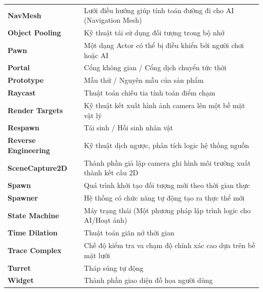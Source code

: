 \documentclass[../DoAn.tex]{subfiles}
\begin{document}
\begin{longtable}{l p{11.5cm}}
    \textbf{NavMesh} & Lưới điều hướng giúp tính toán đường đi cho AI (Navigation Mesh) \\
    \textbf{Object Pooling} & Kỹ thuật tái sử dụng đối tượng trong bộ nhớ \\
    \textbf{Pawn} & Một dạng Actor có thể bị điều khiển bởi người chơi hoặc AI \\
    \textbf{Portal} & Cổng không gian / Cổng dịch chuyển tức thời \\
    \textbf{Prototype} & Mẫu thử / Nguyên mẫu của sản phẩm \\
    \textbf{Raycast} & Thuật toán chiếu tia tính toán điểm chạm \\
    \textbf{Render Targets} & Kỹ thuật kết xuất hình ảnh camera lên một bề mặt vật lý \\
    \textbf{Respawn} & Tái sinh / Hồi sinh nhân vật \\
    \textbf{Reverse Engineering} & Kỹ thuật dịch ngược, phân tích logic hệ thống nguồn \\
    \textbf{SceneCapture2D} & Thành phần giả lập camera ghi hình môi trường xuất thành kết cấu 2D \\
    \textbf{Spawn} & Quá trình khởi tạo đối tượng mới theo thời gian thực \\
    \textbf{Spawner} & Hệ thống có chức năng tự động tạo ra thực thể mới \\
    \textbf{State Machine} & Máy trạng thái (Một phương pháp lập trình logic cho AI/Hoạt ảnh) \\
    \textbf{Time Dilation} & Thuật toán giãn nở thời gian \\
    \textbf{Trace Complex} & Chế độ kiểm tra va chạm độ chính xác cao dựa trên bề mặt lưới \\
    \textbf{Turret} & Tháp súng tự động \\
    \textbf{Widget} & Thành phần giao diện đồ họa người dùng \\
    \hline
\end{longtable}
\end{document}

